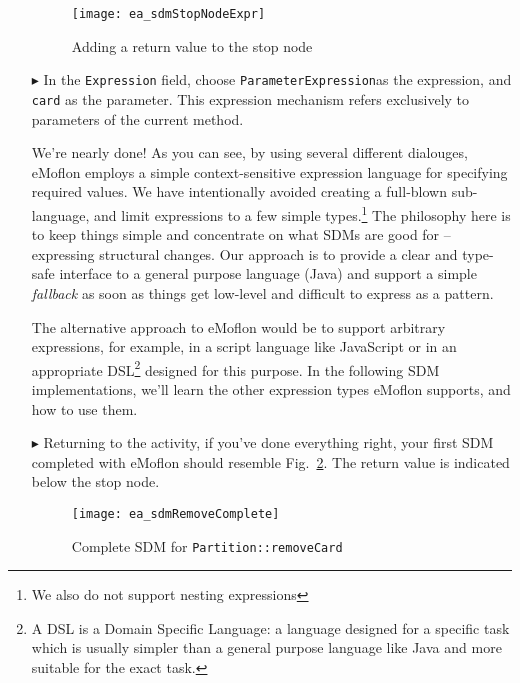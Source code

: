 \begin{itemize}
\begin{figure}[htbp]
\begin{center}
  \texttt{[image: ea\_sdmStopNodeExpr]}
  \caption{Adding a return value to the stop node}  
  \label{fig:stop_node_return_value}
\end{center}
\end{figure}

\item[$\blacktriangleright$] In the \texttt{Expression} field, choose \texttt{ParameterExpression}as the expression, and
\texttt{card} as the parameter. This expression mechanism refers exclusively to parameters of the current method.

\vspace{0.5cm}

We're nearly done! As you can see, by using several different dialouges, eMoflon employs a simple context-sensitive expression language for specifying required
values. We have intentionally avoided creating a full-blown sub-language, and limit expressions to a few simple types.\footnote{We also do not support nesting
expressions} The philosophy here is to keep things simple and concentrate on what SDMs are good for -- expressing structural changes. Our approach is to
provide a clear and type-safe interface to a general purpose language (Java) and support a simple \emph{fallback} as soon as things get low-level and difficult
to express as a pattern.

The alternative approach to eMoflon would be to support arbitrary expressions, for example, in a script language like JavaScript or in an appropriate
DSL\footnote{A DSL is a Domain Specific Language: a language designed for a specific task which is usually simpler than a general purpose language like Java and
more suitable for the exact task.} designed for this purpose. In the following SDM implementations, we'll learn the other expression types eMoflon supports,
and how to use them. 

\item[$\blacktriangleright$] Returning to the activity, if you've done everything right, your first SDM completed with eMoflon should resemble
Fig.~\ref{fig:sdm_complete_control_flow}. The return value is indicated below the stop node.


\begin{figure}[htbp]
\begin{center}
  \texttt{[image: ea\_sdmRemoveComplete]}
  \caption{Complete SDM for \texttt{Partition::removeCard}}  
  \label{fig:sdm_complete_control_flow}
\end{center}
\end{figure}


\end{itemize}
